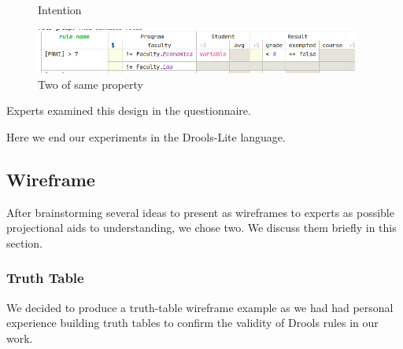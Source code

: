 \begin{figure}
    \centering
    \begin{minipage}{0.35\textwidth}
        \centering
        \caption{Intention}
        \label{fig:SpreadsheetIntentions}
    \end{minipage}\hfill
    \begin{minipage}{0.65\textwidth}
        \centering
        \includegraphics[width=0.95\textwidth]{Sections/images/spreadsheetTwoProperties.png} 
        \caption{Two of same property}
        \label{fig:TwoProperties}
    \end{minipage}
\end{figure}

Experts examined this design in the questionnaire.

Here we end our experiments in the Drools-Lite language.

\subsection{Wireframe}

After brainstorming several ideas to present as wireframes to experts as possible projectional aids to understanding, we chose two.
We discuss them briefly in this section.

\subsubsection{Truth Table}
We decided to produce a truth-table wireframe example as we had had personal experience building truth tables to confirm the validity of Drools rules in our work.

